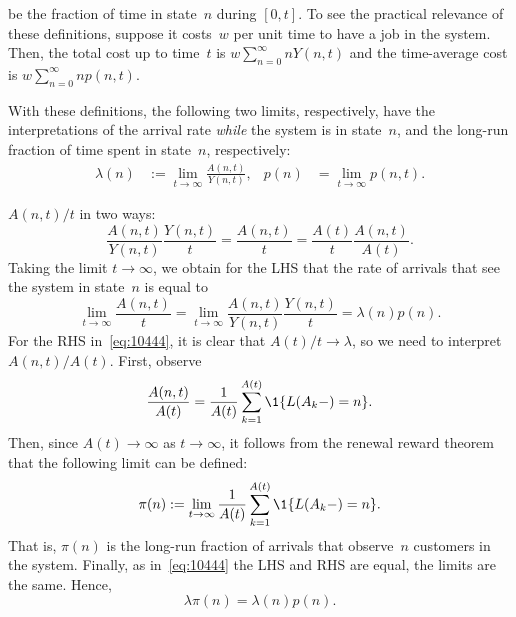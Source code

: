 \documentclass[queueing-book.tex]{subfiles}
\begin{document}
be the fraction of time in state~$n$ during $[0,t]$.
To see the practical relevance of these definitions, suppose it costs~$w$ per unit time to have a job in the system.
Then, the total cost up to time~$t$ is $w \sum_{n=0}^\infty n Y(n,t)$ and the time-average cost is $w \sum_{n=0}^\infty n p(n,t)$.

With these definitions, the following two limits, respectively,
have the interpretations of the arrival rate \emph{while} the system is in state~$n$, and the long-run fraction of time spent in state~$n$, respectively:
\begin{align*}
 \lambda(n) &:= \lim_{t\to\infty} \frac{A(n,t)}{Y(n,t)}, &p(n) &=\lim_{t\to\infty} p(n,t).
\end{align*}

  $A(n,t)/t$ in two ways:
\begin{equation}\label{eq:10444}
\frac{A(n,t)}{Y(n,t)}\frac{Y(n,t)}t  = \frac{A(n,t)}t =  \frac{A(t)}t \frac{A(n,t)}{A(t)}.
\end{equation}
Taking the limit $t\to \infty$, we obtain for the LHS that the rate of arrivals that see the system in state~$n$ is equal to
\begin{equation}\label{eq:lc-3}
\lim_{t\to\infty} \frac{A(n,t)}t = \lim_{t\to\infty} \frac{A(n,t)}{Y(n,t)}\frac{Y(n,t)}t = \lambda(n) p(n).
\end{equation}
For the RHS in~\cref{eq:10444}, it is clear that $A(t)/t\to \lambda$, so we need to interpret $A(n,t)/A(t)$.
First, observe
\begin{equation*}
\frac{A(n,t)}{A(t)}
=   \frac1{A(t)}\sum_{k=1}^{A(t)} \1{\L(A_k-) = n}.
\end{equation*}
Then, since $A(t)\to \infty$ as $t\to\infty$, it follows from the renewal reward theorem that the following limit can be defined:
\begin{equation}\label{eq:pasta2}
\pi(n) := \lim_{t\to\infty}\frac1{A(t)}\sum_{k=1}^{A(t)} \1{\L(A_k-) = n}.
\end{equation}
That is,  $\pi(n)$ is the long-run fraction of arrivals that observe~$n$ customers in the system.
Finally, as in~\cref{eq:10444} the LHS and RHS are equal, the limits are the same. Hence,
\begin{equation}\label{eq:13}
\lambda \pi(n) = \lambda(n) p(n).
\end{equation}
\end{document}
